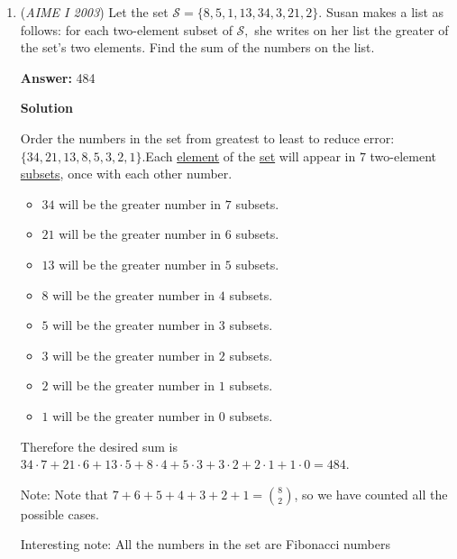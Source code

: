 \begin{enumerate}
 Thus the desired ratio is
 \[{1\over2}\cdot{{100\cdot101\pi}\over{100^2\pi}}={101\over200},\]and $m+n=\boxed{301}$.

 


	\item (\textit{AIME I 2003}) Let the set $\mathcal{S} = \{8, 5, 1, 13, 34, 3, 21, 2\}.$ Susan makes a list as follows: for each two-element subset of $\mathcal{S},$ she writes on her list the greater of the set's two elements. Find the sum of the numbers on the list.


 
 \textbf{Answer: }484



\textbf{Solution}

Order the numbers in the set from greatest to least to reduce error: $\{34, 21, 13, 8, 5, 3, 2, 1\}.$Each \href{https://artofproblemsolving.com/wiki/index.php?title=Element}{element} of the \href{https://artofproblemsolving.com/wiki/index.php?title=Set}{set} will appear in $7$ two-element \href{https://artofproblemsolving.com/wiki/index.php?title=Subset}{subsets}, once with each other number.

 
            \begin{itemize}
        \item $34$ will be the greater number in $7$ subsets.
        \item $21$ will be the greater number in $6$ subsets.
        \item $13$ will be the greater number in $5$ subsets.
        \item $8$ will be the greater number in $4$ subsets.
        \item $5$ will be the greater number in $3$ subsets.
        \item $3$ will be the greater number in $2$ subsets.
        \item $2$ will be the greater number in $1$ subsets.
        \item $1$ will be the greater number in $0$ subsets.
            \end{itemize}
            Therefore the desired sum is $34\cdot7+21\cdot6+13\cdot5+8\cdot4+5\cdot3+3 \cdot2+2\cdot1+1\cdot0=\boxed{484}$.

 Note: Note that $7+6+5+4+3+2+1=\binom{8}{2}$, so we have counted all the possible cases.

 


 Interesting note: All the numbers in the set are Fibonacci numbers

 




\end{enumerate}

